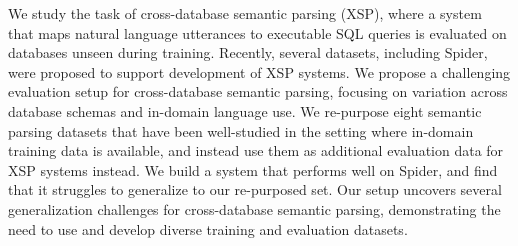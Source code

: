 We study the task of cross-database semantic parsing (XSP), where a system that maps natural language utterances to executable SQL queries is evaluated on databases unseen during training. Recently, several datasets, including Spider, were proposed to support development of XSP systems. We propose a challenging evaluation setup for cross-database semantic parsing, focusing on variation across database schemas and in-domain language use. We re-purpose eight semantic parsing datasets that have been well-studied in the setting where in-domain training data is available, and instead use them as additional evaluation data for XSP systems instead. We build a system that performs well on Spider, and find that it struggles to generalize to our re-purposed set. Our setup uncovers several generalization challenges for cross-database semantic parsing, demonstrating the need to use and develop diverse training and evaluation datasets.
